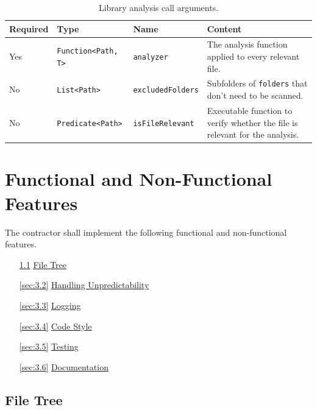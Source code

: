 \documentclass[11pt]{article} %
\begin{document}
    \begin{table}[H]
        \centering
        \begin{tabular}{p{.1\linewidth} | p{.2\linewidth} | p{.2\linewidth} | p{.4\linewidth}}
            \textbf{Required} & \textbf{Type} & \textbf{Name} & \textbf{Content}
            \\\hline
            Yes & \verb|Function<Path, T>| & \verb|analyzer| & The analysis function applied to every
            relevant\hyperref[fn:2]{\footnotemark[2]} file. \\\hline
            No & \verb|List<Path>| & \verb|excludedFolders| &
            Subfolders of
            \verb|folders|\hyperref[fn:1]{\footnotemark[1]} that don't need to be scanned. \\\hline
            No & \verb|Predicate<Path>| & \verb|isFileRelevant| & Executable function to verify whether the file is
            relevant\hyperref[fn:2]{\footnotemark[2]} for the analysis.
        \end{tabular}
        \caption{Library analysis call arguments.}
        \label{tab:call_args}
    \end{table}



    \section{Functional and Non-Functional Features}

    The contractor shall implement the following functional and non-functional features.
    \begin{itemize}
        \item[\ref{sec:3.1}] \hyperref[sec:3.1]{File Tree}
        \item[\ref{sec:3.2}] \hyperref[sec:3.2]{Handling Unpredictability}
        \item[\ref{sec:3.3}] \hyperref[sec:3.3]{Logging}
        \item[\ref{sec:3.4}] \hyperref[sec:3.4]{Code Style}
        \item[\ref{sec:3.5}] \hyperref[sec:3.5]{Testing}
        \item[\ref{sec:3.6}] \hyperref[sec:3.6]{Documentation}
    \end{itemize}


    \subsection{File Tree}\label{sec:3.1}
\end{document}
